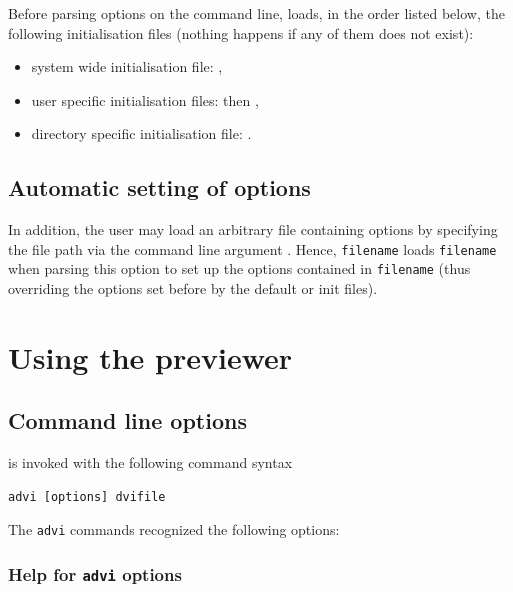\documentclass[12pt]{article}
\begin{document}
Before parsing options on the command line, {\ActiveDVI} loads, in the
order listed below, the following initialisation files (nothing
happens if any of them does not exist):

\begin{itemize}

\item system wide initialisation file: ,

\item user specific initialisation files:  then
,

\item directory specific initialisation file: .

\end{itemize}

\subsection{Automatic setting of options}

In addition, the user may load an arbitrary file containing options by
specifying the file path via the command line argument
.  Hence,  {\tt filename}
loads {\tt filename} when parsing this option to set up the options
contained in {\tt filename} (thus overriding the options set before by
the default  or  init files).

\section{Using the {\ActiveDVI} previewer}

\subsection{Command line options}

{\ActiveDVI} is invoked with the following command syntax
\begin{verbatim}
advi [options] dvifile
\end{verbatim}

\noindent The \verb"advi" commands recognized the following options:

\subsubsection*{Help for {\tt advi} options}
\end{document}
